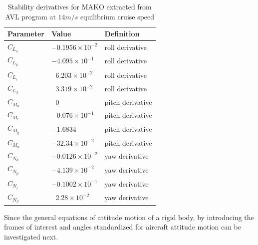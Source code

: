 \begin{table}
\label{arm:momentsMAKO}
\caption{Stability derivatives for MAKO extracted from AVL program at $14 m/s$ equilibrium cruise speed \cite{bronz2016aerodynamic}}
\label{arm:MAKO}
\begin{center}
\begin{tabular}{ ||p{3cm}|p{3cm}|p{3cm}||}\hline
\textbf{Parameter} & \textbf{Value} & \textbf{Definition} \\\hline
$C_{L_a}$                             & $-0.1956 \times 10^{-2}$	   & roll derivative \\\hline
$C_{L_{\tilde{p}}}$                 & $-4.095 \times 10^{-1}$	   & roll derivative \\\hline
$C_{L_{\tilde{r}}} $                 & $\ \ \, 6.203 \times 10^{-2}$     & roll derivative \\\hline
$C_{L_\beta}$                        & $\ \ \, 3.319 \times 10^{-2}$	   & roll derivative \\\hline
$C_{M_0}$ 			     & $\ \ \, 0$  &  pitch derivative \\\hline
$C_{M_e}$ 			     & $-0.076 \times 10^{-1}$  &  pitch derivative \\\hline
$C_{M_{\tilde{q}}} $               & $-1.6834$	                            & pitch derivative \\\hline
$C_{M_\alpha} $                    & $-32.34 \times 10^{-2}$ 	   & pitch derivative \\\hline
$C_{N_a}$                             & $-0.0126 \times 10^{-2}$	   & yaw derivative \\\hline
$C_{N_{\tilde{p}}}$                 & $-4.139 \times 10^{-2}$ 	   & yaw derivative \\\hline
$C_{N_{\tilde{r}}}$                 & $-0.1002 \times 10^{-1}$	   & yaw derivative \\\hline
$C_{N_\beta} $                      & $\ \ \, 2.28 \times 10^{-2}$	   & yaw derivative \\\hline
\end{tabular}
\end{center}
\end{table}






Since the general equations of attitude motion of a rigid body, by introducing the frames of interest and angles standardized for aircraft attitude motion can be investigated next. 






